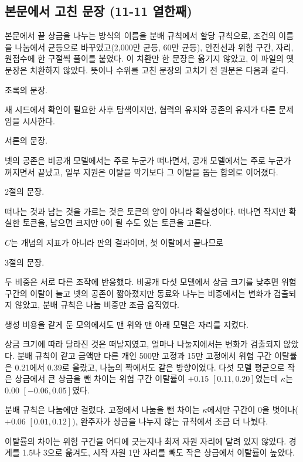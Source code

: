 \subsection{본문에서 고친 문장 (11-11 열한째)}\label{app:construct-moved-11}

본문에서 끝 상금을 나누는 방식의 이름을 분배 규칙에서 할당 규칙으로, 조건의 이름을 나눔에서 균등으로 바꾸었고(2,000만 균등, 60만 균등), 안전선과 위험 구간, 자리, 원점수에 한 구절씩 풀이를 붙였다. 이 치환만 한 문장은 옮기지 않았고, 이 파일의 옛 문장은 치환하지 않았다. 뜻이나 수위를 고친 문장의 고치기 전 원문은 다음과 같다.

초록의 문장.

{\color{black}새 시드에서 확인이 필요한 사후 탐색이지만, 협력의 유지와 공존의 유지가 다른 문제임을 시사한다.}

서론의 문장.

{\color{black}넷의 공존은 비공개 모델에서는 주로 누군가 떠나면서, 공개 모델에서는 주로 누군가 꺼지면서 끝났고, 일부 지원은 이탈을 막기보다 그 이탈을 돕는 합의로 이어졌다.}

2절의 문장.

{\color{black}떠나는 것과 남는 것을 가르는 것은 토큰의 양이 아니라 확실성이다. 떠나면 작지만 확실한 토큰을, 남으면 크지만 0이 될 수도 있는 토큰을 고른다.}

{\color{black}$C$는 개념의 지표가 아니라 판의 결과이며, 첫 이탈에서 끝나므로}

3절의 문장.

{\color{black}두 비중은 서로 다른 조작에 반응했다. 비공개 다섯 모델에서 상금 크기를 낮추면 위험 구간의 이탈이 늘고 넷의 공존이 짧아졌지만 동료와 나누는 비중에서는 변화가 검출되지 않았고, 분배 규칙은 나눔 비중만 조금 움직였다.}

{\color{black}생성 비용을 같게 둔 모의에서도 맨 위와 맨 아래 모델은 자리를 지켰다.}

{\color{black}상금 크기에 따라 달라진 것은 떠날지였고, 얼마나 나눌지에서는 변화가 검출되지 않았다. 분배 규칙이 같고 금액만 다른 개인 500만 고정과 15만 고정에서 위험 구간 이탈률은 0.21에서 0.39로 올랐고, 나눔의 짝에서도 같은 방향이었다. 다섯 모델 평균으로 작은 상금에서 큰 상금을 뺀 차이는 위험 구간 이탈률이 $+0.15$ $[0.11,0.20]$였는데 $\kappa$는 $0.00$ $[-0.06,0.05]$였다.}

{\color{black}분배 규칙은 나눔에만 걸렸다. 고정에서 나눔을 뺀 차이는 $\kappa$에서만 구간이 0을 벗어나($+0.06$ $[0.01,0.12]$), 완주자가 상금을 나누지 않는 규칙에서 조금 더 나눴다.}

{\color{black}이탈률의 차이는 위험 구간을 어디에 긋는지나 최저 자원 자리에 달려 있지 않았다. 경계를 1.5나 3으로 옮겨도, 시작 자원 1만 자리를 빼도 작은 상금에서 이탈률이 높았다.}

